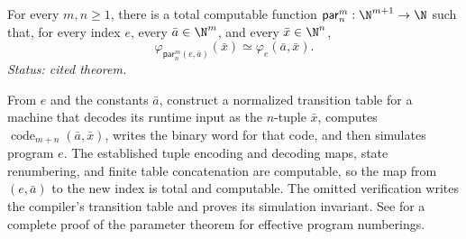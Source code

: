 \begin{theorem}
\label{thm:parameter}
For every \(m,n\geq1\), there is a total computable function
\(\mathsf{par}_n^m:\N^{m+1}\to\N\) such that, for every index \(e\), every \(\bar a\in\N^m\), and every
\(\bar x\in\N^n\),
\[
  \varphi_{\mathsf{par}_n^m(e,\bar a)}(\bar x)
  \simeq \varphi_e(\bar a,\bar x).
\]
\textit{Status: cited theorem.}
\end{theorem}

From \(e\) and the constants \(\bar a\), construct a normalized transition
table for a machine that decodes its runtime input as the \(n\)-tuple
\(\bar x\), computes
\(\operatorname{code}_{m+n}(\bar a,\bar x)\), writes the binary word for that code,
and then simulates program \(e\).  The established tuple encoding and decoding
maps, state renumbering, and finite table concatenation are computable, so the
map from \((e,\bar a)\) to the new index is total and computable.  The omitted
verification writes the compiler's transition table and proves its simulation
invariant.  See \cite{Kleene1952} for a complete proof of the parameter
theorem for effective program numberings.
